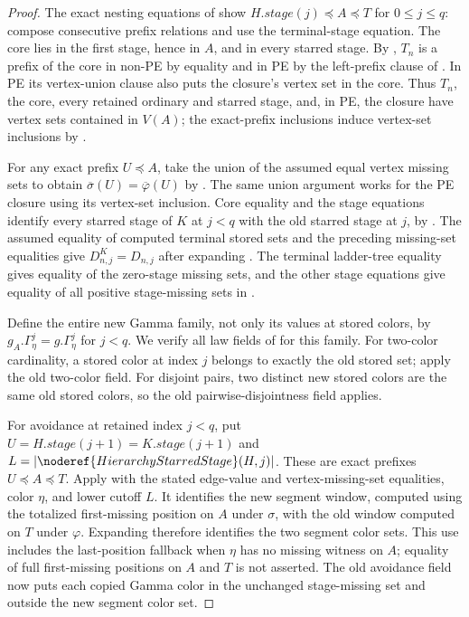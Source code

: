 \begin{proof}
The exact nesting equations of  show
$H.\mathit{stage}(j)\preccurlyeq A\preccurlyeq T$ for $0\le j\le q$:
compose consecutive prefix relations and use the terminal-stage equation.
The core lies in the first stage, hence in $A$, and in every starred
stage.  By , $T_n$ is a prefix of the core
in non-PE by equality and in PE by the left-prefix clause of
.  In PE its vertex-union clause also puts
the closure's vertex set in the core.  Thus $T_n$, the core, every retained
ordinary and starred stage, and, in PE, the closure have vertex sets
contained in $V(A)$; the exact-prefix inclusions induce vertex-set
inclusions by .

For any exact prefix $U\preccurlyeq A$, take the union of the assumed
equal vertex missing sets to obtain
$\overline\sigma(U)=\overline\varphi(U)$ by .
The same union argument works for the PE closure using its vertex-set
inclusion.  Core equality and the stage equations identify every starred
stage of $K$ at $j<q$ with the old starred stage at $j$, by
.  The assumed equality of computed
terminal stored sets and the preceding missing-set equalities give
$D^K_{n,j}=D_{n,j}$ after expanding .
The terminal ladder-tree equality gives equality of the zero-stage
missing sets, and the other stage equations give equality of all positive
stage-missing sets in .

Define the entire new Gamma family, not only its values at stored colors,
by $g_A.\Gamma^j_\eta=g.\Gamma^j_\eta$ for $j<q$.
We verify all law fields of  for this family.
For two-color cardinality, a stored color at index $j$ belongs to exactly
the old stored set; apply the old two-color field.
For disjoint pairs, two distinct new stored colors are the same old
stored colors, so the old pairwise-disjointness field applies.

For avoidance at retained index $j<q$, put
$U=H.\mathit{stage}(j+1)=K.\mathit{stage}(j+1)$ and
$L=|\noderef{HierarchyStarredStage}(H,j)|$.
These are exact prefixes $U\preccurlyeq A\preccurlyeq T$.
Apply  with the stated
edge-value and vertex-missing-set equalities, color $\eta$, and lower
cutoff $L$.  It identifies the new segment window, computed using the
totalized first-missing position on $A$ under $\sigma$, with the old
window computed on $T$ under $\varphi$.
Expanding  therefore identifies the
two segment color sets.  This use includes the last-position fallback
when $\eta$ has no missing witness on $A$; equality of full first-missing
positions on $A$ and $T$ is not asserted.
The old avoidance field now puts each copied Gamma color in the unchanged
stage-missing set and outside the new segment color set.


\end{proof}

